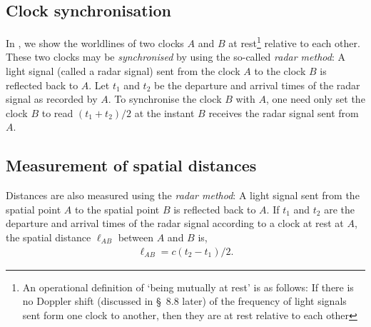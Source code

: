 \begin{small}
\subsection{Clock synchronisation}
In , we show the worldlines of two clocks $A$ 
and $B$ at rest\footnote{An operational  definition of 
`being mutually at rest' is as follows: If there is no 
Doppler shift (discussed in \S~8.8 later) of the frequency 
of light signals sent form one clock to another, then they 
are at rest relative to each other} relative to each other. 
These two clocks  may be \textsl{synchronised} by using the 
so-called \textsl{radar method}: A light signal (called a 
radar signal) sent from the clock $A$ to the clock $B$ is 
reflected back to $A$. Let $t_1$ and $t_2$ be the departure 
and arrival times of the radar signal as recorded by $A$. To 
synchronise the clock $B$ with $A$, one need only set the 
clock $B$ to read  $(t_1 + t_2)/2$ at the instant $B$ 
receives the radar signal sent from $A$.

\newpage

\begin{figure}[H]
\begin{center}
\caption{}\label{fig4.2}
\end{center}
\end{figure}

\subsection{Measurement of spatial distances} 
Distances are also measured using the \textsl{radar 
method}: 
A light signal sent from the spatial point  $A$ to the 
spatial point $B$ is reflected back to $A$. If  $t_1$ and 
$t_2$ are the departure and arrival times of the radar 
signal according to a clock at rest at $A$, the spatial 
distance $\ell_{AB}$ between $A$ and $B$ is, 
\begin{align}\label{str.1}
\ell_{AB}=c(t_2-t_1)/2.
\end{align}


\end{small}
